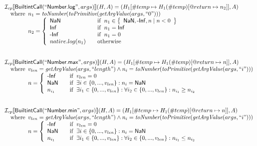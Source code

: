 \[\begin{array}{l}
\I _{cp}\lbr \SF{BuiltintCall}(``\SF{Number.log}",args)\rbr(H,A)
  = (H_1[\#temp \mapsto H_1(\#temp)[@return \mapsto n_2]], A)\\
\quad\wherec{
  n_1 = \hf{toNumber}(\hf{toPrimitive}(\hf{getArgValue}(args, ``0")))\\
  n_2 = \left\{
    \begin{array}{l@{\quad\quad}l}
      \SF{NaN} & \ifc{n_1 \in \set{\SF{NaN}, \SF{-Inf}, n \mid n<0}}\\
      \SF{Inf} & \ifc{n_1=\SF{Inf}}\\
      \SF{-Inf} & \ifc{n_1=0}\\
      native.log(n_1) & \owc 
    \end{array}
  \right.
  }\\
\\\\


\I _{cp}\lbr \SF{BuiltintCall}(``\SF{Number.max}",args)\rbr(H,A)
  = (H_1[\#temp \mapsto H_1(\#temp)[@return \mapsto n]], A)\\
\quad\wherec{
  v_{len} = \hf{getArgValue}(args, ``length")
  \land n_i = \hf{toNumber}(\hf{toPrimitive}(\hf{getArgValue}(args, ``i")))\\
  n =
    \left\{\begin{array}{l@{\quad\quad}l}
	  \SF{-Inf} & \ifc{v_{len} = 0}\\
	  \SF{NaN} & \ifc{\exists i \in \{0,..., v_{len}\}: n_i = \SF{NaN}}\\
      n_{i_1} & \ifc{\exists i_1 \in \{0,..., v_{len}\}: \forall i_2 \in \{0,..., v_{len}\}: n_{i_1} \geq n_{i_2}}
    \end{array}\right.
  }\\
\\\\



\I _{cp}\lbr \SF{BuiltintCall}(``\SF{Number.min}",args)\rbr(H,A)
  = (H_1[\#temp \mapsto H_1(\#temp)[@return \mapsto n]], A)\\
\quad\wherec{
  v_{len} = \hf{getArgValue}(args, ``length")
  \land n_i = \hf{toNumber}(\hf{toPrimitive}(\hf{getArgValue}(args, ``i")))\\
  n =
    \left\{\begin{array}{l@{\quad\quad}l}
	  \SF{-Inf} & \ifc{v_{len} = 0}\\
	  \SF{NaN} & \ifc{\exists i \in \{0,..., v_{len}\}: n_i = \SF{NaN}}\\
      n_{i_1} & \ifc{\exists i_1 \in \{0,..., v_{len}\}: \forall i_2 \in \{0,..., v_{len}\}: n_{i_1} \leq n_{i_2}}
    \end{array}\right.
  }\\
\\\\


\end{array}
\]


